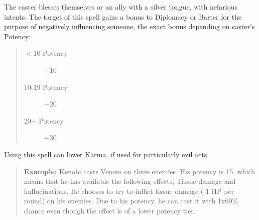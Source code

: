 \documentclass[11pt,a4paper,twocolumn]{book}
\begin{document}
The caster blesses themselves or an ally with a silver tongue, with nefarious intents. The target of this spell gains a bonus to Diplomacy or Barter for the purpose of negatively influencing someone, the exact bonus depending on caster's Potency:
\begin{quote}
	\begin{description}
		\item[$<$10 Potency] 	+10
		\item[10-19 Potency] 	+20
		\item[20+ Potency] 		+30
	\end{description}	
\end{quote}

Using this spell can lower Karma, if used for particularly evil acts.






\begin{verse}
	\textbf{Example:} Kenobi casts Venom on three enemies. His potency is 15, which means that he has available the following effects; Tissue damage and hallucinations. He chooses to try to inflict tissue damage (-1 HP per round) on his enemies. Due to his potency, he can cast it with 1x60\% chance even though the effect is of a lower potency tier.
\end{verse}






\end{document}
